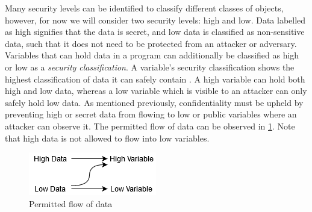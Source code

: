 \documentclass[twocolumn]{article}
\begin{document}
Many security levels can be identified to classify different classes of objects, however, for now we will consider two security levels: high and low. Data labelled as high signifies that the data is secret, and low data is classified as non-sensitive data, such that it does not need to be protected from an attacker or adversary. Variables that can hold data in a program can additionally be classified as high or low as a \textit{security classification}. A variable's security classification shows the highest classification of data it can safely contain \cite{winter2020information}. A high variable can hold both high and low data, whereas a low variable which is visible to an attacker can only safely hold low data. As mentioned previously, confidentiality must be upheld by preventing high or secret data from flowing to low or public variables where an attacker can observe it. The permitted flow of data can be observed in \ref{fig:flow}. Note that high data is not allowed to flow into low variables.

\begin{figure}
    \includegraphics{flow.png}
    \caption{Permitted flow of data}
    \label{fig:flow}
\end{figure}
\end{document}
